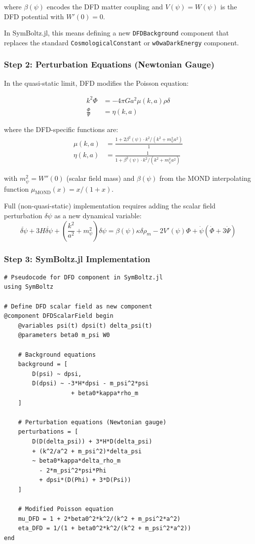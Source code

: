 \documentclass[11pt,a4paper]{article}
\begin{document}
where $\beta(\psi)$ encodes the DFD matter coupling and $V(\psi) = W(\psi)$ is the DFD potential with $W'(0) = 0$.

In SymBoltz.jl, this means defining a new \texttt{DFDBackground} component that replaces the standard \texttt{CosmologicalConstant} or \texttt{w0waDarkEnergy} component.

\subsubsection{Step 2: Perturbation Equations (Newtonian Gauge)}

In the quasi-static limit, DFD modifies the Poisson equation:

\begin{align}
k^2 \Phi &= -4\pi G a^2 \mu(k,a) \rho \delta \\
\frac{\Phi}{\Psi} &= \eta(k,a)
\end{align}

where the DFD-specific functions are:
\begin{align}
\mu(k,a) &= \frac{1 + 2\beta^2(\psi) \cdot k^2/(k^2 + m_\psi^2 a^2)}{1} \\
\eta(k,a) &= \frac{1}{1 + \beta^2(\psi) \cdot k^2/(k^2 + m_\psi^2 a^2)}
\end{align}

with $m_\psi^2 = W''(0)$ (scalar field mass) and $\beta(\psi)$ from the MOND interpolating function $\mu_\mathrm{MOND}(x) = x/(1+x)$.

Full (non-quasi-static) implementation requires adding the scalar field perturbation $\delta\psi$ as a new dynamical variable:
\begin{equation}
\ddot{\delta\psi} + 3H\dot{\delta\psi} + \left(\frac{k^2}{a^2} + m_\psi^2\right)\delta\psi = \beta(\psi) \kappa \delta\rho_m - 2V'(\psi)\Phi + \dot{\psi}(\dot{\Phi} + 3\dot{\Psi})
\end{equation}

\subsubsection{Step 3: SymBoltz.jl Implementation}

\begin{verbatim}
# Pseudocode for DFD component in SymBoltz.jl
using SymBoltz

# Define DFD scalar field as new component
@component DFDScalarField begin
    @variables psi(t) dpsi(t) delta_psi(t)
    @parameters beta0 m_psi W0

    # Background equations
    background = [
        D(psi) ~ dpsi,
        D(dpsi) ~ -3*H*dpsi - m_psi^2*psi
                   + beta0*kappa*rho_m
    ]

    # Perturbation equations (Newtonian gauge)
    perturbations = [
        D(D(delta_psi)) + 3*H*D(delta_psi)
        + (k^2/a^2 + m_psi^2)*delta_psi
        ~ beta0*kappa*delta_rho_m
          - 2*m_psi^2*psi*Phi
          + dpsi*(D(Phi) + 3*D(Psi))
    ]

    # Modified Poisson equation
    mu_DFD = 1 + 2*beta0^2*k^2/(k^2 + m_psi^2*a^2)
    eta_DFD = 1/(1 + beta0^2*k^2/(k^2 + m_psi^2*a^2))
end
\end{verbatim}
\end{document}
